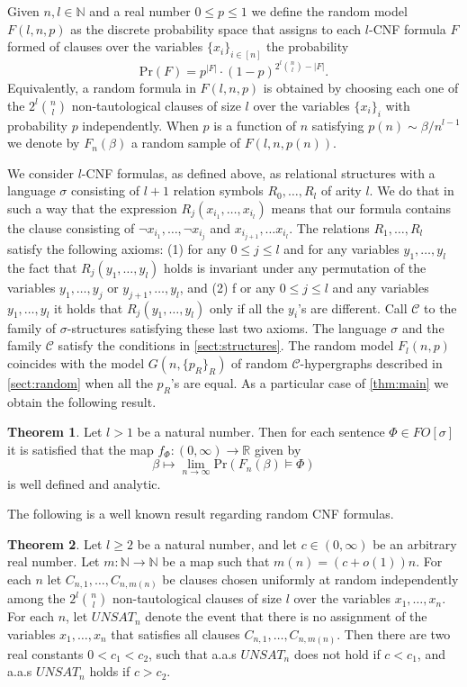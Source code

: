 \documentclass[12pt,notitlepage,a4paper]{article}
\theoremstyle{definition}
\newtheorem{theorem}{Theorem}[section]
\newcommand{\R}{\mathbb{R}}
\newcommand{\N}{\mathbb{N}}
\newcommand{\Ln}{\lim\limits_{n\to \infty}}
\newcommand{\PR}[1]{\mathrm{Pr}\left(#1\right)}
\begin{document}
Given $n, l \in \N$ and a real number $0\leq p \leq 1$ we define
the random model $F(l,n,p)$ as the discrete probability space that
assigns to each $l$-CNF formula $F$ formed of clauses over
the variables $\{x_i\}_{i\in [n]}$
 the probability
\[
\PR{F}= p^{|F|}\cdot (1-p)^{2^l\binom{n}{l}-|F|}.
\] 
Equivalently, a random formula in $F(l,n,p)$ is obtained
by choosing each one of the $2^l\binom{n}{l}$ non-tautological
clauses of size $l$ over the variables $\{x_i\}_{i}$
with probability $p$ independently. When
$p$ is a function of $n$ satisfying
$p(n)\sim \beta/n^{l-1}$ we denote by $F_n(\beta)$ a random sample
of $F(l,n,p(n))$.
\par	
We consider $l$-CNF formulas, as defined above, as relational 
structures with a language $\sigma$ consisting of $l+1$ relation symbols
$R_0,\dots, R_l$ of arity $l$. We do that in such a way that the expression
$R_j(x_{i_1},\dots,x_{i_l})$ means that our formula contains the clause
consisting of $\neg x_{i_1}, \dots, \neg x_{i_j}$ and $x_{i_{j+1}},\dots
x_{i_l}$. The relations $R_1,\dots, R_l$ satisfy the 
following axioms: (1) for any $0\leq j \leq l$ and 
for any variables $y_1,\dots, y_l$ the fact that
$R_j(y_1,\dots, y_l)$ holds
is invariant under any permutation of the variables 
$y_1,\dots,y_j$ or $y_{j+1},\dots,y_l$, and (2) f
or any $0\leq j \leq l$ and 
any variables $y_1,\dots, y_l$ it holds that
$R_j(y_1,\dots, y_l)$ only if all the $y_i$'s are different. 
Call $\mathcal{C}$ to the family of $\sigma$-structures satisfying these last two axioms.
The language $\sigma$ and the family $\mathcal{C}$ satisfy the conditions in 
\cref{sect:structures}. The random model $F_l(n,p)$ coincides with the model
$G(n,\{p_R\}_{R})$ of random $\mathcal{C}$-hypergraphs described in 
\cref{sect:random} when all the $p_R$'s are equal. As a particular
case of \cref{thm:main} we obtain the following result. 
\begin{theorem} \label{thm:mainsat}
	Let $l>1$ be a natural number.
	Then for each sentence $\Phi\in FO[\sigma]$ 
	it is satisfied
	that the map $f_\Phi: (0,\infty) \rightarrow \R$ given by
	\[
	\beta \mapsto \Ln \PR{ F_n(\beta)\models \Phi}
	\]
	is well defined and analytic. 
\end{theorem}
The following is a well known result regarding random CNF formulas. 
\begin{theorem} 
Let $l\geq 2$ be a natural number, and let $c\in (0,\infty)$ 
be an arbitrary real number. 
Let $m:\N\rightarrow \N$ be a map such that
$m(n)=(c+o(1))n$. For each $n$ let $C_{n,1},\dots, C_{n,m(n)}$
be clauses chosen uniformly at random independently among the 
$2^l \binom{n}{l}$ non-tautological clauses of size $l$ over the
variables $x_1,\dots, x_n$. For each $n$, let $UNSAT_n$
denote the event that there is no assignment of the variables
$x_1,\dots,x_n$ that satisfies all clauses $C_{n,1},\dots, C_{n,m(n)}$. 
Then there are two real constants $0<c_1<c_2$, such that 
a.a.s $UNSAT_n$ does not hold if $c< c_1$, and a.a.s $UNSAT_n$ holds
if $c> c_2$. 
\end{theorem}
\end{document}
